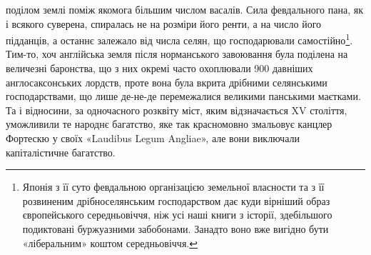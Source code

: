 поділом землі поміж якомога більшим числом васалів.
Сила февдального пана, як і всякого суверена, спиралась не на
розміри його ренти, а на число його підданців, а останнє залежало
від числа селян, що господарювали самостійно\footnote{
Японія з її суто февдальною організацією земельної власности
та з її розвиненим дрібноселянським господарством дає куди вірніший
образ європейського середньовіччя, ніж усі наші книги з історії, здебільшого
подиктовані буржуазними забобонами. Занадто воно вже вигідно
бути «ліберальним» коштом середньовіччя.
}. Тим-то,
хоч англійська земля після норманського завоювання була
поділена на величезні баронства, що з них окремі часто охоплювали
900 давніших англосаксонських лордств, проте вона була
вкрита дрібними селянськими господарствами, що лише де-не-де
перемежалися великими панськими маєтками. Та і відносини,
за одночасного розквіту міст, яким відзначається XV століття,
уможливили те народнє багатство, яке так красномовно
змальовує канцлер Фортескю у своїх «Laudibus Legum Angliae»,
але вони виключали капіталістичне багатство.

